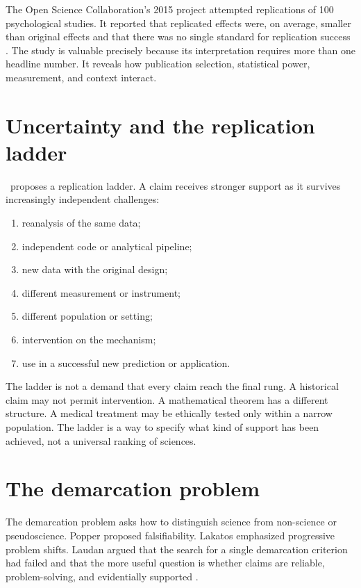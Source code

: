 The Open Science Collaboration's 2015 project attempted replications of 100
psychological studies. It reported that replicated effects were, on average,
smaller than original effects and that there was no single standard for
replication success \citep{osc2015}. The study is valuable precisely because
its interpretation requires more than one headline number. It reveals how
publication selection, statistical power, measurement, and context interact.

\section{Uncertainty and the replication ladder}

\RCR\ proposes a replication ladder. A claim receives stronger support as it
survives increasingly independent challenges:

\begin{enumerate}
\item reanalysis of the same data;
\item independent code or analytical pipeline;
\item new data with the original design;
\item different measurement or instrument;
\item different population or setting;
\item intervention on the mechanism;
\item use in a successful new prediction or application.
\end{enumerate}

The ladder is not a demand that every claim reach the final rung. A historical
claim may not permit intervention. A mathematical theorem has a different
structure. A medical treatment may be ethically tested only within a narrow
population. The ladder is a way to specify what kind of support has been
achieved, not a universal ranking of sciences.

\section{The demarcation problem}

The demarcation problem asks how to distinguish science from non-science or
pseudoscience. Popper proposed falsifiability. Lakatos emphasized progressive
problem shifts. Laudan argued that the search for a single demarcation
criterion had failed and that the more useful question is whether claims are
reliable, problem-solving, and evidentially supported \citep{laudan1977,laudan1983}.

